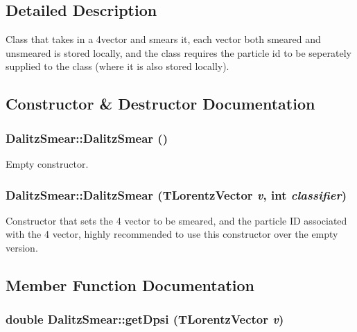 \subsection{Detailed Description}
Class that takes in a 4vector and smears it, each vector both smeared and unsmeared is stored locally, and the class requires the particle id to be seperately supplied to the class (where it is also stored locally). 



\subsection{Constructor \& Destructor Documentation}
\subsubsection{\setlength{\rightskip}{0pt plus 5cm}Dalitz\-Smear::Dalitz\-Smear ()}\label{classDalitzSmear_ee03f5d7721abecd419ec687c392a080}


Empty constructor. 

\subsubsection{\setlength{\rightskip}{0pt plus 5cm}Dalitz\-Smear::Dalitz\-Smear (TLorentz\-Vector {\em v}, int {\em classifier})}\label{classDalitzSmear_d76d70d15e07a9264c54a6052458e4d9}


Constructor that sets the 4 vector to be smeared, and the particle ID associated with the 4 vector, highly recommended to use this constructor over the empty version. 



\subsection{Member Function Documentation}
\subsubsection{\setlength{\rightskip}{0pt plus 5cm}double Dalitz\-Smear::get\-Dpsi (TLorentz\-Vector {\em v})\hspace{0.3cm}{\tt  [private]}}\label{classDalitzSmear_63b59045fde437179ab561ea81d369aa}


